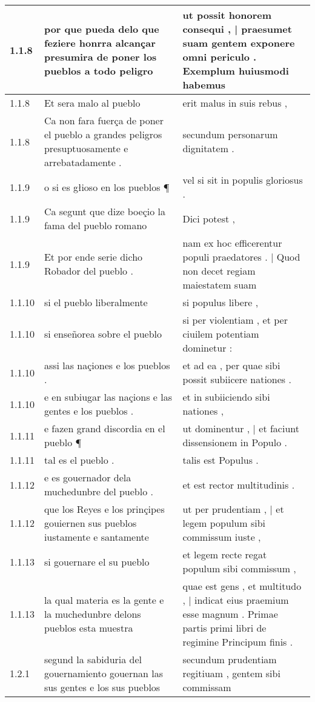 \begin{tabular}{|p{1cm}|p{6.5cm}|p{6.5cm}|}
1.1.8 & por que pueda delo que feziere honrra alcançar presumira de poner los pueblos a todo peligro & ut possit honorem consequi , | praesumet suam gentem exponere omni periculo . Exemplum huiusmodi habemus \\\hline
1.1.8 & Et sera malo al pueblo & erit malus in suis rebus , \\\hline
1.1.8 & Ca non fara fuerça de poner el pueblo a grandes peligros presuptuosamente e arrebatadamente . & secundum personarum dignitatem . \\\hline
1.1.9 & o si es głioso en los pueblos ¶ & vel si sit in populis gloriosus . \\\hline
1.1.9 & Ca segunt que dize boeçio la fama del pueblo romano & Dici potest , \\\hline
1.1.9 & Et por ende serie dicho Robador del pueblo . & nam ex hoc efficerentur populi praedatores . | Quod non decet regiam maiestatem suam \\\hline
1.1.10 & si el pueblo liberalmente & si populus libere , \\\hline
1.1.10 & si enseñorea sobre el pueblo & si per violentiam , et per ciuilem potentiam dominetur : \\\hline
1.1.10 & assi las naçiones e los pueblos . & et ad ea , per quae sibi possit subiicere nationes . \\\hline
1.1.10 & e en subiugar las naçions e las gentes e los pueblos . & et in subiiciendo sibi nationes , \\\hline
1.1.11 & e fazen grand discordia en el pueblo ¶ & ut dominentur , | et faciunt dissensionem in Populo . \\\hline
1.1.11 & tal es el pueblo . & talis est Populus . \\\hline
1.1.12 & e es gouernador dela muchedunbre del pueblo . & et est rector multitudinis . \\\hline
1.1.12 & que los Reyes e los prinçipes gouiernen sus pueblos iustamente e santamente & ut per prudentiam , | et legem populum sibi commissum iuste , \\\hline
1.1.13 & si gouernare el su pueblo & et legem recte regat populum sibi commissum , \\\hline
1.1.13 & la qual materia es la gente e la muchedunbre delons pueblos esta muestra & quae est gens , et multitudo , | indicat eius praemium esse magnum . Primae partis primi libri de regimine Principum finis . \\\hline
1.2.1 & segund la sabiduria del gouernamiento gouernan las sus gentes e los sus pueblos & secundum prudentiam regitiuam , gentem sibi commissam \\\hline

\end{tabular}
